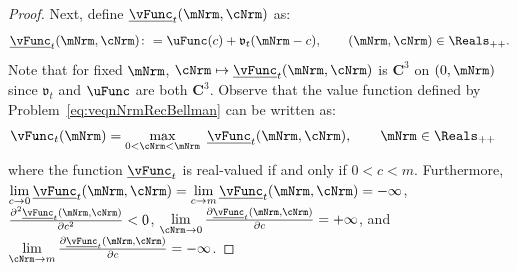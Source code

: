 \documentclass[\econtexRoot/BufferStockTheory]{subfiles}
\begin{document}
\begin{proof}
Next, define $\underline{\vFunc}_{t}(\mNrm,\cNrm)$ as:
%
%
\begin{equation*}
  \underline{\vFunc}_{t}(\mNrm,\cNrm)\colon =\uFunc(c)+\mathfrak{v}_{t}(\mNrm-c), \qquad (\mNrm,\cNrm)\in \Reals_{++}.
\end{equation*}
%
Note that for fixed $\mNrm$, $\cNrm \mapsto \underline{\vFunc}_{t}(\mNrm,\cNrm)$ is $\mathbf{C}^{3}$ on $(0, \mNrm)$ since $\mathfrak{v}_{t}$ and $\uFunc$ are both
$\mathbf{C}^{3}$.
Observe that the value function defined
by Problem~\eqref{eq:veqnNrmRecBellman} can be written as:
%
\begin{equation*}\begin{gathered}\begin{aligned}
      \vFunc_{t}(\mNrm) & =  \max_{0<\cNrm<\mNrm}~\underline{\vFunc}_{t}(\mNrm,\cNrm), \qquad \mNrm\in \Reals_{++}
    \end{aligned}\end{gathered}\end{equation*}
%
where the function $\underline{\vFunc}_{t}$ is real-valued if and only if $0<c<m$.
Furthermore,
$\lim\limits_{c \rightarrow
  0}\underline{\vFunc}_{t}(\mNrm,\cNrm)=\lim\limits_{c\rightarrow m} \underline{\vFunc}_{t}(\mNrm,\cNrm)=-\infty $, $\frac{\partial ^{2}\underline{\vFunc}_{t}(\mNrm,\cNrm)}{\partial c^{2}}%
<0$, $\lim\limits_{\cNrm \rightarrow 0}\frac{\partial \underline{\vFunc}_{t}(\mNrm,\cNrm)}{\partial c}%
=+\infty $, and $\lim\limits_{\cNrm\rightarrow m} \frac{\partial \underline{\vFunc}_{t}(\mNrm,\cNrm)}{%
  \partial c}=-\infty $.


\end{proof}
\end{document}
